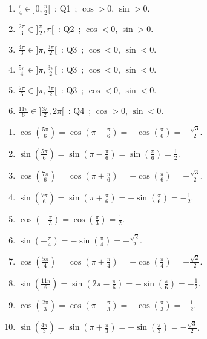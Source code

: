 
\begin{enumerate}
  \item $\frac{\pi}{4}\in]0,\frac{\pi}{2}[$~: Q1~; $\cos>0$, $\sin>0$.
  \item $\frac{2\pi}{3}\in]\frac{\pi}{2},\pi[$~: Q2~; $\cos<0$, $\sin>0$.
  \item $\frac{4\pi}{3}\in]\pi,\frac{3\pi}{2}[$~: Q3~; $\cos<0$, $\sin<0$.
  \item $\frac{5\pi}{4}\in]\pi,\frac{3\pi}{2}[$~: Q3~; $\cos<0$, $\sin<0$.
  \item $\frac{7\pi}{6}\in]\pi,\frac{3\pi}{2}[$~: Q3~; $\cos<0$, $\sin<0$.
  \item $\frac{11\pi}{6}\in]\frac{3\pi}{2},2\pi[$~: Q4~; $\cos>0$, $\sin<0$.
\end{enumerate}


\begin{enumerate}
  \item $\cos(\frac{5\pi}{6})=\cos(\pi-\frac{\pi}{6})=-\cos(\frac{\pi}{6})=-\frac{\sqrt{3}}{2}$.
  \item $\sin(\frac{5\pi}{6})=\sin(\pi-\frac{\pi}{6})=\sin(\frac{\pi}{6})=\frac{1}{2}$.
  \item $\cos(\frac{7\pi}{6})=\cos(\pi+\frac{\pi}{6})=-\cos(\frac{\pi}{6})=-\frac{\sqrt{3}}{2}$.
  \item $\sin(\frac{7\pi}{6})=\sin(\pi+\frac{\pi}{6})=-\sin(\frac{\pi}{6})=-\frac{1}{2}$.
  \item $\cos(-\frac{\pi}{3})=\cos(\frac{\pi}{3})=\frac{1}{2}$.
  \item $\sin(-\frac{\pi}{4})=-\sin(\frac{\pi}{4})=-\frac{\sqrt{2}}{2}$.
  \item $\cos(\frac{5\pi}{4})=\cos(\pi+\frac{\pi}{4})=-\cos(\frac{\pi}{4})=-\frac{\sqrt{2}}{2}$.
  \item $\sin(\frac{11\pi}{6})=\sin(2\pi-\frac{\pi}{6})=-\sin(\frac{\pi}{6})=-\frac{1}{2}$.
  \item $\cos(\frac{2\pi}{3})=\cos(\pi-\frac{\pi}{3})=-\cos(\frac{\pi}{3})=-\frac{1}{2}$.
  \item $\sin(\frac{4\pi}{3})=\sin(\pi+\frac{\pi}{3})=-\sin(\frac{\pi}{3})=-\frac{\sqrt{3}}{2}$.
\end{enumerate}


